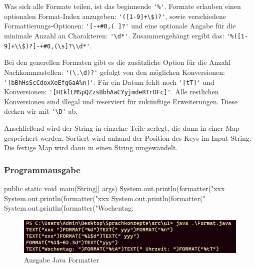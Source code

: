 Was sich alle Formate teilen, ist das beginnende \verb|'%'|.
Formate erlauben einen optionalen Format-Index anzugeben: \verb|'([1-9]+\$)?'|, sowie verschiedene Formattierungs-Optionen: \verb|'[-+#0,( ]?'| und eine optionale Angabe für die
minimale Anzahl an Charakteren: \verb|'\d*'|.\newline
Zusammengehängt ergibt das: \verb|'%([1-9]+\\$)?[-+#0,(\s]?\\d*'|.

Bei den generellen Formaten gibt es die zusätzliche Option für die Anzahl Nachkommastellen: \verb|'(\.\d)?'| gefolgt von den möglichen Konversionen: \verb|'[bBhHsScCdoxXeEfgGaA%n]'|.\newline
Für ein Datum fehlt noch \verb|'[tT]'| und Konversionen: \verb|'[HIklLMSpQZzsBbhAaCYyjmdeRTrDFc]'|.\newline
Alle restlichen Konversionen sind illegal und reserviert für zukünftige Erweiterungen. Diese decken wir mit \verb|'\D'| ab.

Anschließend wird der String in einzelne Teile zerlegt, die dann in einer Map gespeichert werden.
Sortiert wird anhand der Position des Keys im Input-String. \newline
Die fertige Map wird dann in einen String umgewandelt. \newline

\subsubsection{Programmausgabe}

\begin{code}[language=java, caption={Input für Formatter}, label={lst:Aufgabe1a_in}]
public static void main(String[] args) {
  System.out.println(formatter("xxx %
  System.out.println(formatter("xxx%
  System.out.println(formatter("%
  System.out.println(formatter("Wochentag: %
}
\end{code}

\begin{figure}[h]
	\includegraphics[width=\textwidth]{media/Aufgabe1a_formatter_output}
	\caption{Ausgabe Java Formatter}
	\label{img:Aufgabe1a_output}
\end{figure}

